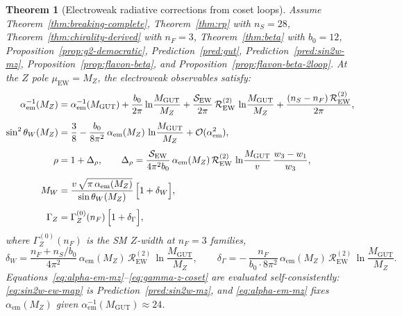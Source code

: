 \documentclass[aps,prd,onecolumn,amsmath,amssymb,nofootinbib,11pt]{revtex4-2}
\numberwithin{equation}{section}
\theoremstyle{plain}
\newtheorem{theorem}{Theorem}[section]
\theoremstyle{definition}
\theoremstyle{remark}
\begin{document}
\begin{theorem}[Electroweak radiative corrections from coset loops]
\label{thm:ew-radiative-complete}
Assume Theorem~\ref{thm:breaking-complete}, Theorem~\ref{thm:rp} with
$n_S=28$, Theorem~\ref{thm:chirality-derived} with $n_F=3$,
Theorem~\ref{thm:beta} with $b_0=12$, Proposition~\ref{prop:g2-democratic},
Prediction~\ref{pred:gut}, Prediction~\ref{pred:sin2w-mz},
Proposition~\ref{prop:flavon-beta}, and Proposition~\ref{prop:flavon-beta-2loop}.
At the $Z$ pole $\mu_{\mathrm{EW}}=M_Z$, the electroweak observables satisfy:
\begin{align}
  \alpha_{\mathrm{em}}^{-1}(M_Z)
  &=
  \alpha_{\mathrm{em}}^{-1}(M_{\mathrm{GUT}})
  + \frac{b_0}{2\pi}\ln\!\frac{M_{\mathrm{GUT}}}{M_Z}
  + \frac{\mathcal{S}_{\mathrm{EW}}}{2\pi}\,
    \mathcal{R}_{\mathrm{EW}}^{(2)}\,
    \ln\!\frac{M_{\mathrm{GUT}}}{M_Z}
  + \frac{(n_S-n_F)\,\mathcal{R}_{\mathrm{EW}}^{(2)}}{2\pi},
  \label{eq:alpha-em-mz}\\[4pt]
  \sin^2\theta_W(M_Z)
  &=
  \frac38
  - \frac{b_0}{8\pi^2}\,\alpha_{\mathrm{em}}(M_Z)\,
    \ln\!\frac{M_{\mathrm{GUT}}}{M_Z}
  + \mathcal{O}(\alpha_{\mathrm{em}}^2),
  \label{eq:sin2w-ew-map}\\[4pt]
  \rho
  &=
  1 + \Delta_\rho,
  \qquad
  \Delta_\rho
  =
  \frac{\mathcal{S}_{\mathrm{EW}}}{4\pi^2 b_0}\,
  \alpha_{\mathrm{em}}(M_Z)\,
  \mathcal{R}_{\mathrm{EW}}^{(2)}\,
  \ln\!\frac{M_{\mathrm{GUT}}}{v}\,
  \frac{w_3-w_1}{w_3},
  \label{eq:rho-coset}\\[4pt]
  M_W
  &=
  \frac{v\,\sqrt{\pi\,\alpha_{\mathrm{em}}(M_Z)}}{\sin\theta_W(M_Z)}\,
  \Bigl[1+\delta_W\Bigr],
  \label{eq:mw-coset}\\[4pt]
  \Gamma_Z
  &=
  \Gamma_Z^{(0)}(n_F)\,
  \Bigl[1+\delta_\Gamma\Bigr],
  \label{eq:gamma-z-coset}
\end{align}
where $\Gamma_Z^{(0)}(n_F)$ is the SM $Z$-width at $n_F=3$ families,
\begin{equation}\label{eq:mw-gamma-deltas}
  \delta_W
  =
  \frac{n_F+n_S/b_0}{4\pi^2}\,
  \alpha_{\mathrm{em}}(M_Z)\,
  \mathcal{R}_{\mathrm{EW}}^{(2)}\,
  \ln\!\frac{M_{\mathrm{GUT}}}{M_Z},
  \qquad
  \delta_\Gamma
  =
  -\,\frac{n_F}{b_0\cdot 8\pi^2}\,
  \alpha_{\mathrm{em}}(M_Z)\,
  \mathcal{R}_{\mathrm{EW}}^{(2)}\,
  \ln\!\frac{M_{\mathrm{GUT}}}{M_Z}.
\end{equation}
Equations~\eqref{eq:alpha-em-mz}--\eqref{eq:gamma-z-coset} are evaluated
self-consistently: \eqref{eq:sin2w-ew-map} is Prediction~\ref{pred:sin2w-mz},
and \eqref{eq:alpha-em-mz} fixes $\alpha_{\mathrm{em}}(M_Z)$ given
$\alpha_{\mathrm{em}}^{-1}(M_{\mathrm{GUT}})\approx24$.
\end{theorem}
\end{document}
